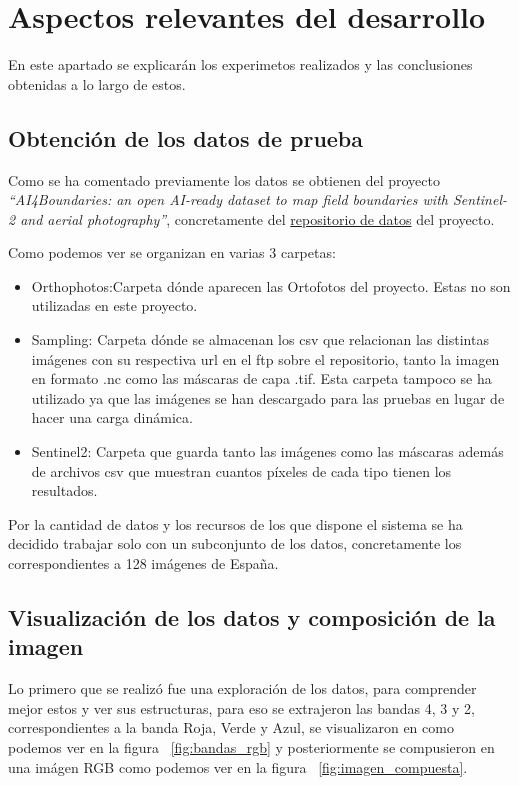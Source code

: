 \chapter{Aspectos relevantes del desarrollo}
En este apartado se explicarán los experimetos realizados y las conclusiones obtenidas a lo largo de estos.

\section{Obtención de los datos de prueba}\label{sect:datosPrueba}
Como se ha comentado previamente los datos se obtienen del proyecto \textit{``AI4Boundaries: an open AI-ready dataset to map field boundaries with Sentinel-2 and aerial photography''}\cite{AI4boundaries}, concretamente del  \href{https://jeodpp.jrc.ec.europa.eu/ftp/jrc-opendata/DRLL/AI4BOUNDARIES/}{repositorio de datos} del proyecto.

Como podemos ver se organizan en varias 3 carpetas:

\begin{itemize}
	\item{Orthophotos}:Carpeta dónde aparecen las Ortofotos del proyecto. Estas no son utilizadas en este proyecto.
	\item{Sampling}: Carpeta dónde se almacenan los csv que relacionan las distintas imágenes con su respectiva url en el ftp sobre el repositorio, tanto la imagen en formato .nc como las máscaras de capa .tif. Esta carpeta tampoco se ha utilizado ya que las imágenes se han descargado para las pruebas en lugar de hacer una carga dinámica.
	\item{Sentinel2}: Carpeta que guarda tanto las imágenes como las máscaras además de archivos csv que muestran cuantos píxeles de cada tipo tienen los resultados.
\end{itemize}

Por la cantidad de datos y los recursos de los que dispone el sistema se ha decidido trabajar solo con un subconjunto de los datos, concretamente los correspondientes a 128 imágenes de España.

\section{Visualización de los datos y composición de la imagen}
Lo primero que se realizó fue una exploración de los datos, para comprender mejor estos y ver sus estructuras, para eso se extrajeron las bandas 4, 3 y 2, correspondientes a la banda Roja, Verde y Azul, se visualizaron en como podemos ver en la figura ~\ref{fig:bandas_rgb} y posteriormente se compusieron en una imágen RGB como podemos ver en la figura ~\ref{fig:imagen_compuesta}.


